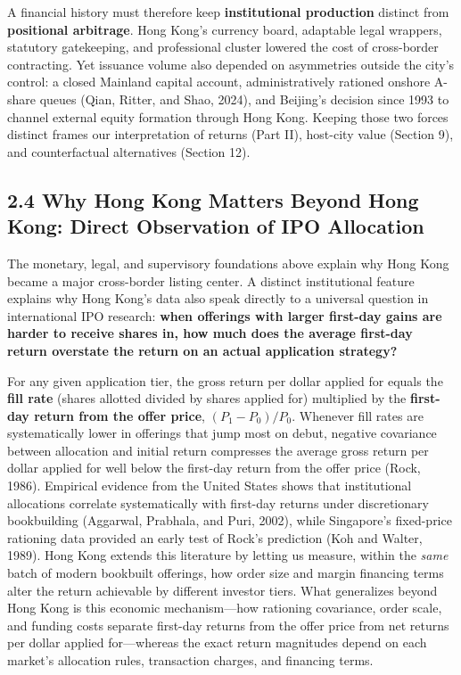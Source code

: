 \documentclass[11pt,letterpaper]{article}
\begin{document}
A financial history must therefore keep \textbf{institutional production} distinct from \textbf{positional arbitrage}. Hong Kong's currency board, adaptable legal wrappers, statutory gatekeeping, and professional cluster lowered the cost of cross-border contracting. Yet issuance volume also depended on asymmetries outside the city's control: a closed Mainland capital account, administratively rationed onshore A-share queues (Qian, Ritter, and Shao, 2024), and Beijing's decision since 1993 to channel external equity formation through Hong Kong. Keeping those two forces distinct frames our interpretation of returns (Part II), host-city value (Section 9), and counterfactual alternatives (Section 12).

\subsection*{\texorpdfstring{2.4 Why Hong Kong Matters Beyond Hong Kong: Direct Observation of IPO Allocation}{2.4 Why Hong Kong Matters Beyond Hong Kong: Direct Observation of IPO Allocation}}
The monetary, legal, and supervisory foundations above explain why Hong Kong became a major cross-border listing center. A distinct institutional feature explains why Hong Kong's data also speak directly to a universal question in international IPO research: \textbf{when offerings with larger first-day gains are harder to receive shares in, how much does the average first-day return overstate the return on an actual application strategy?}

For any given application tier, the gross return per dollar applied for equals the \textbf{fill rate} (shares allotted divided by shares applied for) multiplied by the \textbf{first-day return from the offer price}, $(P_1 - P_0)/P_0$. Whenever fill rates are systematically lower in offerings that jump most on debut, negative covariance between allocation and initial return compresses the average gross return per dollar applied for well below the first-day return from the offer price (Rock, 1986). Empirical evidence from the United States shows that institutional allocations correlate systematically with first-day returns under discretionary bookbuilding (Aggarwal, Prabhala, and Puri, 2002), while Singapore's fixed-price rationing data provided an early test of Rock's prediction (Koh and Walter, 1989). Hong Kong extends this literature by letting us measure, within the \textit{same} batch of modern bookbuilt offerings, how order size and margin financing terms alter the return achievable by different investor tiers. What generalizes beyond Hong Kong is this economic mechanism—how rationing covariance, order scale, and funding costs separate first-day returns from the offer price from net returns per dollar applied for—whereas the exact return magnitudes depend on each market's allocation rules, transaction charges, and financing terms.
\end{document}
